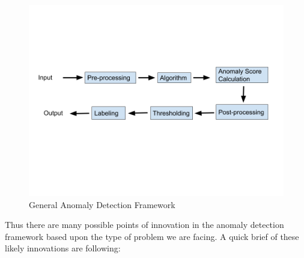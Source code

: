 \documentclass[12pt]{article}
\begin{document}
\begin{figure}[H]
\centering
        \includegraphics[width=\textwidth]{images/generalAnomalyDetectionFrameWork.png}
    \caption{General Anomaly Detection Framework}
    \label{generalAnomalyDetectionFrameWork}
\end{figure}
Thus there are many possible points of innovation in the anomaly detection framework based upon the type of problem we are facing. A quick brief of these likely innovations are following:
\end{document}
